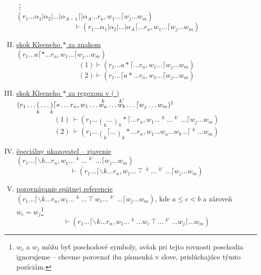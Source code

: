 \documentclass{svk_long_sk}
\begin{document}
\begin{definition}
\begin{enumerate}[I.]
\\ \vdots \\ $(r_1 \dots \alpha_1 | \alpha_2 | \dots | \alpha_{A-1} \lceil | \alpha_A \dots r_n, w_1\dots \lceil w_j \dots w_m)$
$$\vdash (r_1 \dots \alpha_1 | \alpha_2 | \dots | \alpha_A \lceil \dots r_n, w_1\dots \lceil w_j \dots w_m)$$
\item \underline{skok Kleeneho $*$ za znakom}
\\ $(r_1\dots a\lceil *\dots r_n, w_1\dots\lceil w_j\dots w_m)$
$$(1) \vdash (r_1\dots a *\lceil\dots r_n, w_1\dots\lceil w_j\dots w_m)$$
$$(2) \vdash (r_1\dots \lceil a *\dots r_n, w_1\dots\lceil w_j\dots w_m)$$
\item \underline{skok Kleeneho $*$ za regexom v ( )}
\\ $\displaystyle{(r_1 \dots \mathop{(}_k \dots \mathop{)}_k\lceil * \dots r_n, w_1 \dots \mathop{w_a}^k \dots \mathop{w_b}^{k'} \dots \lceil w_j \dots w_m)\footnotemark}$
$$(1) ~\vdash(r_1 \dots \mathop{(}_k \dots \mathop{)}_k *\lceil \dots r_n, w_1 \dots \mathop{w_a}^k \dots \mathop{w_b}^{k'} \dots \lceil w_j \dots w_m)$$
$$(2) ~\vdash(r_1 \dots \mathop{(}_k\lceil \dots \mathop{)}_k * \dots r_n, w_1 \dots w_a \dots w_b \dots \lceil \mathop{w_j}^k \dots w_m)$$
\item \underline{špeciálny ukazovateľ -- zjavenie}
\\ $\displaystyle{(r_1 \dots \lceil \backslash k \dots r_n,w_1\dots\mathop{w_a}^k\dots\mathop{w_b}^{k'}\dots \lceil w_j\dots w_m)}$
$$\vdash(r_1 \dots \lceil \backslash k \dots r_n,w_1\ldots\intercal\mathop{w_a}^k \dots \mathop{w_b}^{k'} \dots \lceil w_j\dots w_m)$$	
\item \underline{porovnávanie spätnej referencie}
\\ $\displaystyle{(r_1 \dots \lceil \backslash k \dots r_n,w_1\dots\mathop{w_a}^k\ldots \intercal w_c \dots \mathop{w_b}^{k'} \dots \lceil w_j\dots w_m)}$, kde $a\leq c < b$ a zároveň $w_c = w_j$\footnote{$w_c$ a $w_j$ môžu byť poschodové symboly, avšak pri tejto rovnosti poschodia ignorujeme -- chceme porovnať iba písmenká v slove, prislúchajúce týmto pozíciám.}
$$\vdash(r_1 \dots \lceil \backslash k \dots r_n,w_1\dots\mathop{w_a}^k\dots w_c\intercal \dots \mathop{w_b}^{k'} \dots  w_j\lceil\dots w_m)$$

\end{enumerate}
\end{definition}
\end{document}
